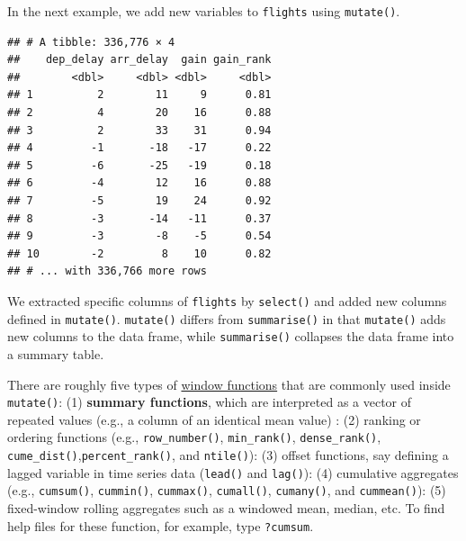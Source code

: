 \documentclass[]{book}
\newenvironment{Shaded}{\begin{snugshade}}{\end{snugshade}}
\newcommand{\KeywordTok}[1]{\textcolor[rgb]{0.13,0.29,0.53}{\textbf{{#1}}}}
\newcommand{\DataTypeTok}[1]{\textcolor[rgb]{0.13,0.29,0.53}{{#1}}}
\newcommand{\DecValTok}[1]{\textcolor[rgb]{0.00,0.00,0.81}{{#1}}}
\newcommand{\StringTok}[1]{\textcolor[rgb]{0.31,0.60,0.02}{{#1}}}
\newcommand{\CommentTok}[1]{\textcolor[rgb]{0.56,0.35,0.01}{\textit{{#1}}}}
\newcommand{\NormalTok}[1]{{#1}}
\theoremstyle{definition}
\theoremstyle{definition}
\theoremstyle{remark}
\begin{document}
In the next example, we add new variables to \texttt{flights} using
\texttt{mutate()}.

\begin{Shaded}
\end{Shaded}

\begin{verbatim}
## # A tibble: 336,776 × 4
##    dep_delay arr_delay  gain gain_rank
##        <dbl>     <dbl> <dbl>     <dbl>
## 1          2        11     9      0.81
## 2          4        20    16      0.88
## 3          2        33    31      0.94
## 4         -1       -18   -17      0.22
## 5         -6       -25   -19      0.18
## 6         -4        12    16      0.88
## 7         -5        19    24      0.92
## 8         -3       -14   -11      0.37
## 9         -3        -8    -5      0.54
## 10        -2         8    10      0.82
## # ... with 336,766 more rows
\end{verbatim}

We extracted specific columns of \texttt{flights} by \texttt{select()}
and added new columns defined in \texttt{mutate()}. \texttt{mutate()}
differs from \texttt{summarise()} in that \texttt{mutate()} adds new
columns to the data frame, while \texttt{summarise()} collapses the data
frame into a summary table.

There are roughly five types of
\href{https://cran.r-project.org/web/packages/dplyr/vignettes/window-functions.html}{window
functions} that are commonly used inside \texttt{mutate()}: (1)
\textbf{summary functions}, which are interpreted as a vector of
repeated values (e.g., a column of an identical mean value) : (2)
ranking or ordering functions (e.g., \texttt{row\_number()},
\texttt{min\_rank()}, \texttt{dense\_rank()},
\texttt{cume\_dist()},\texttt{percent\_rank()}, and \texttt{ntile()}):
(3) offset functions, say defining a lagged variable in time series data
(\texttt{lead()} and \texttt{lag()}): (4) cumulative aggregates (e.g.,
\texttt{cumsum()}, \texttt{cummin()}, \texttt{cummax()},
\texttt{cumall()}, \texttt{cumany()}, and \texttt{cummean()}): (5)
fixed-window rolling aggregates such as a windowed mean, median, etc. To
find help files for these function, for example, type \texttt{?cumsum}.
\end{document}
